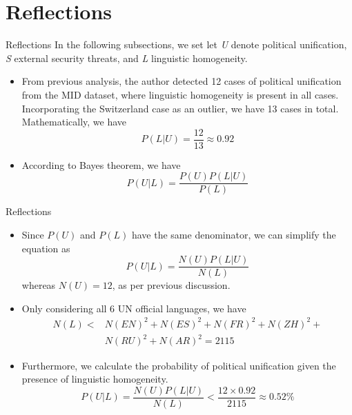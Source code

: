 \documentclass{beamer}
\begin{document}
	\section{Reflections}
	\begin{frame}{Reflections}
		In the following subsections, we set let \textit{U} denote political unification, \textit{S} external security threats, and \textit{L} linguistic homogeneity.
		\begin{itemize}
			\item From previous analysis, the author detected 12 cases of political unification from the MID dataset, where linguistic homogeneity is present in all cases. Incorporating the Switzerland case as an outlier, we have 13 cases in total. Mathematically, we have
			\begin{equation}
				P(L|U)=\frac{12}{13} \approx 0.92
			\end{equation}
			\item According to Bayes theorem, we have 
			\begin{equation}
				P(U|L)=\frac{P(U)P(L|U)}{P(L)}
			\end{equation}
		\end{itemize}
	\end{frame}
	\begin{frame}{Reflections}
		\begin{itemize}
			\item Since $P(U)$ and $P(L)$ have the same denominator, we can simplify the equation as
			\begin{equation}
				P(U|L)=\frac{N(U)P(L|U)}{N(L)}
			\end{equation}
			whereas $N(U)=12$, as per previous discussion.
			\item Only considering all 6 UN official languages, we have
			\begin{equation}
				\begin{aligned}
					N(L)< & N(EN)^2 + N(ES)^2 + N(FR)^2 + N(ZH)^2 + \\
					& N(RU)^2 + N(AR)^2 = 2115
				\end{aligned}
			\end{equation}
			\item Furthermore, we calculate the probability of political unification given the presence of linguistic homogeneity.
			\begin{equation}
				P(U|L)=\frac{N(U)P(L|U)}{N(L)}<\frac{12\times 0.92}{2115}\approx 0.52\%
			\end{equation}
		\end{itemize}
	\end{frame}
\end{document}

